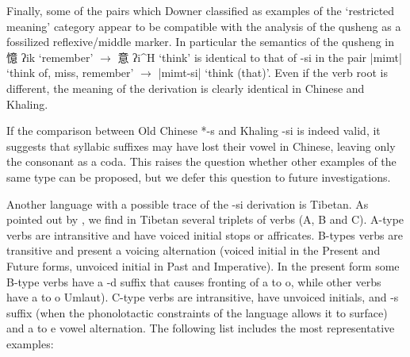 \documentclass[oldfontcommands,oneside,a4paper,11pt]{article}
\newcommand{\ipa}[1]{{\phon \mbox{#1}}} %
\newcommand{\zh}[1]{{\cn #1}}
\newcommand{\ch}[3]{\zh{#1} \ipa{#2} `#3'}
\begin{document}
Finally, some of the pairs which Downer classified as examples of the `restricted meaning' category appear to be compatible with the analysis of the qusheng as a fossilized reflexive/middle marker. In particular the semantics of the qusheng in \ch{憶}{ʔik}{remember} $\rightarrow$ \ch{意}{ʔi^H}{think} is identical to that of \ipa{-si} in the pair \ipa{|mimt|} `think of, miss, remember' $\rightarrow$ \ipa{|mimt-si|} `think (that)'. Even if the verb root is different, the meaning of the derivation is clearly identical in Chinese and Khaling.

If the comparison between Old Chinese *\ipa{-s} and Khaling \ipa{-si} is indeed valid, it suggests that syllabic suffixes may have lost their vowel in Chinese, leaving only the consonant as a coda. This raises the question whether other examples of the same type can be proposed, but we defer this question to future investigations.

Another language with a possible trace of the \ipa{-si} derivation is Tibetan. As pointed out by \citet{hill14voicing}, we find in Tibetan several triplets of verbs (A, B and C). A-type verbs are intransitive and have voiced initial stops or affricates. B-types verbs are transitive and present a voicing alternation (voiced initial in the Present and Future forms, unvoiced initial in Past and Imperative). In the present form some B-type verbs have a \ipa{-d} suffix that causes fronting of \ipa{a} to \ipa{o}, while other verbs have \ipa{a} to \ipa{o} Umlaut). C-type verbs are intransitive, have unvoiced initials, and \ipa{-s} suffix (when the phonolotactic constraints of the language allows it to surface) and \ipa{a} to \ipa{e} vowel alternation. The following list includes the most representative examples:
\end{document}
